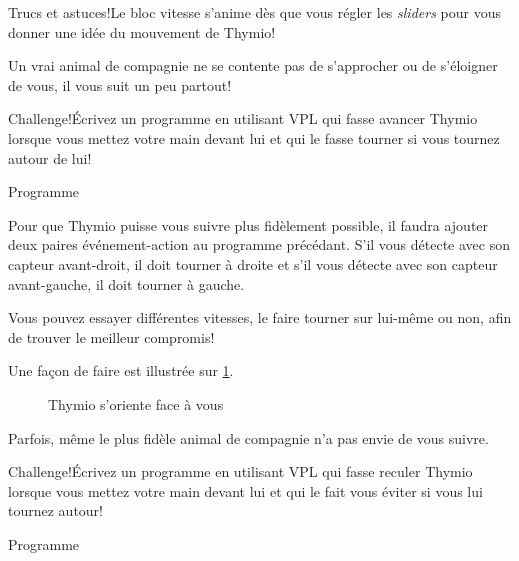 \begin{bclogo}[couleur = blue!30, arrondi = 0.1, logo = \bcinfo, ombre = true]{Trucs et astuces!}Le bloc vitesse s'anime dès que vous régler les \textit{sliders} pour vous donner une idée du mouvement de Thymio!
\end{bclogo}


Un vrai animal de compagnie ne se contente pas de s'approcher ou de s'éloigner de vous, il vous suit un peu partout! 

\begin{bclogo}[couleur = pink!30, arrondi = 0.1, logo = \bccrayon, ombre = true]{Challenge!}Écrivez un programme en utilisant VPL qui fasse avancer Thymio lorsque vous mettez votre main devant lui et qui le fasse tourner si vous tournez autour de lui!
\end{bclogo}

{\raggedleft \hfill Programme }

Pour que Thymio puisse vous suivre plus fidèlement possible, il faudra ajouter deux paires événement-action au programme précédant. S'il vous détecte avec son capteur avant-droit, il doit tourner à droite et s'il vous détecte avec son capteur avant-gauche, il doit tourner à gauche.

Vous pouvez essayer différentes vitesses, le faire tourner sur lui-même ou non, afin de trouver le meilleur compromis! 

Une façon de faire est illustrée sur \cref{fig.likes}.

\begin{figure}
\begin{center}
\caption{Thymio s'oriente face à vous}\label{fig.likes}
\end{center}
\end{figure}


Parfois, même le plus fidèle animal de compagnie n'a pas envie de vous suivre. 

\begin{bclogo}[couleur = pink!30, arrondi = 0.1, logo = \bccrayon, ombre = true]{Challenge!}Écrivez un programme en utilisant VPL qui fasse reculer Thymio lorsque vous mettez votre main devant lui et qui le fait vous éviter si vous lui tournez autour!
\end{bclogo}

{\raggedleft \hfill Programme }

